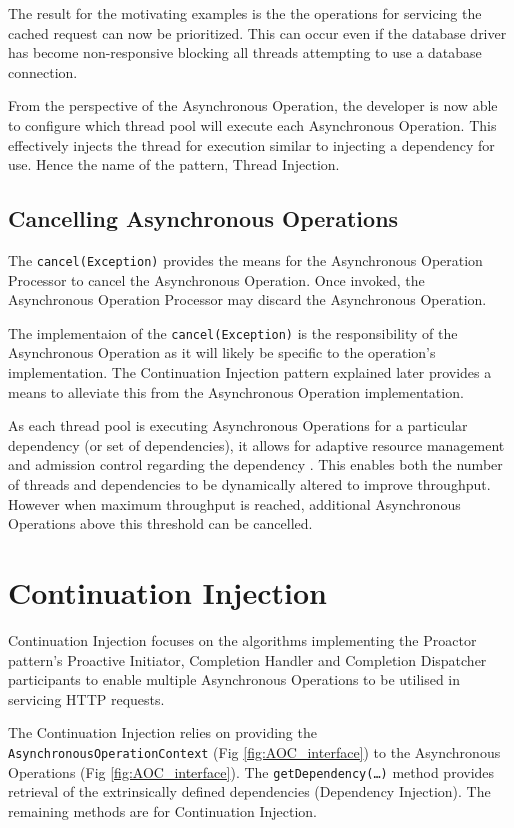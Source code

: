 \documentclass{article}
\begin{document}
The result for the motivating examples is the the operations for servicing the
cached request can now be prioritized.  This can occur even if the database
driver has become non-responsive blocking all threads attempting to use a
database connection.

From the perspective of the Asynchronous Operation, the developer is now able to
configure which thread pool will execute each Asynchronous Operation.  This
effectively injects the thread for execution similar to injecting a dependency
for use.  Hence the name of the pattern, Thread Injection.


\subsection{Cancelling Asynchronous Operations}

The \texttt{cancel(Exception)} provides the means for the Asynchronous Operation
Processor to cancel the Asynchronous Operation.  Once invoked, the Asynchronous
Operation Processor may discard the Asynchronous Operation.

The implementaion of the \texttt{cancel(Exception)} is the responsibility of the
Asynchronous Operation as it will likely be specific to the operation's
implementation.  The Continuation Injection pattern explained later provides a
means to alleviate this from the Asynchronous Operation implementation.

As each thread pool is executing Asynchronous Operations for a particular
dependency (or set of dependencies), it allows for adaptive resource management
and admission control regarding the dependency \cite{seda}.  This enables both
the number of threads and dependencies to be dynamically altered to improve
throughput.  However when maximum throughput is reached, additional Asynchronous
Operations above this threshold can be cancelled.


\section{Continuation Injection}

Continuation Injection focuses on the algorithms implementing the Proactor pattern's
Proactive Initiator, Completion Handler and Completion Dispatcher participants
to enable multiple Asynchronous Operations to be utilised in servicing HTTP
requests.

The Continuation Injection relies on providing the
\texttt{AsynchronousOperationContext} (Fig \ref{fig:AOC_interface}) to the
Asynchronous Operations (Fig
\ref{fig:AOC_interface}).  The \texttt{getDependency(\ldots)}
method provides retrieval of the extrinsically defined dependencies (Dependency
Injection).  The remaining methods are for Continuation Injection.
\end{document}
